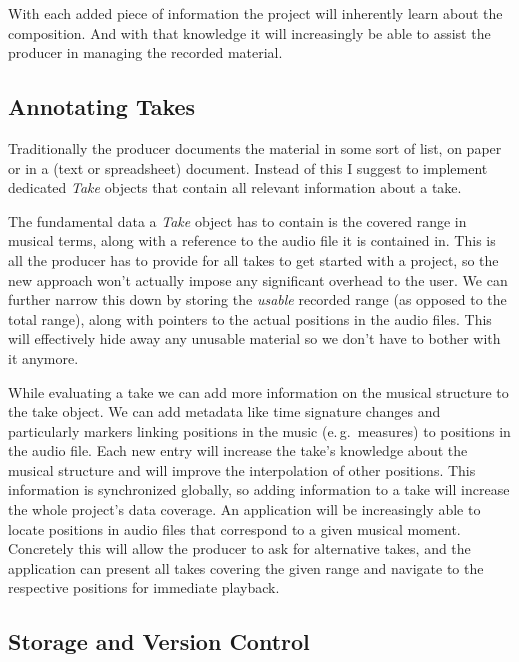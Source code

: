 \documentclass[11pt,a4paper]{article}
\begin{document}
With each added piece of information the project will inherently learn about the
composition.
And with that knowledge it will increasingly be able to assist the producer in
managing the recorded material.

\subsection{Annotating Takes}
Traditionally the producer documents the material in some sort of list, on paper
or in a (text or spreadsheet) document.
Instead of this I suggest to implement dedicated \emph{Take} objects that
contain all relevant information about a take.

The fundamental data a \emph{Take} object has to contain is the covered range in
musical terms, along with a reference to the audio file it is contained in.
This is all the producer has to provide for all takes to get started with a
project, so the new approach won't actually impose any significant overhead to
the user.
We can further narrow this down by storing the \emph{usable} recorded range (as
opposed to the total range), along with pointers to the actual positions in the
audio files.
This will effectively hide away any unusable material so we don't have to bother
with it anymore.

While evaluating a take we can add more information on the musical structure to
the take object.
We can add metadata like time signature changes and particularly markers linking
positions in the music (e.\,g.\ measures) to positions in the audio file.
Each new entry will increase the take's knowledge about the musical structure
and will improve the interpolation of other positions.
This information is synchronized globally, so adding information to a take will
increase the whole project's data coverage.
An application will be increasingly able to locate positions in audio files that
correspond to a given musical moment.
Concretely this will allow the producer to ask for alternative takes, and the
application can present all takes covering the given range and navigate to the
respective positions for immediate playback.

\subsection{Storage and Version Control}
\end{document}
